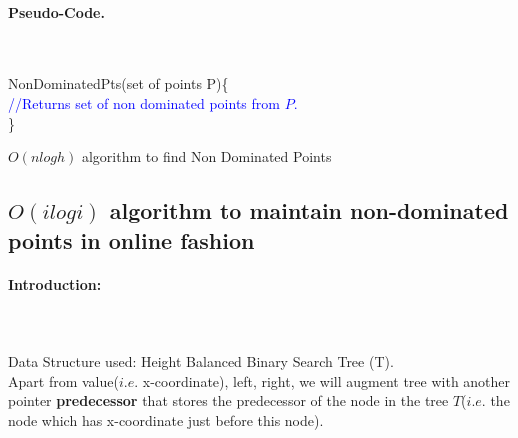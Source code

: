 \documentclass[pdftex,a4paper,12pt]{report}
\begin{document}
\newpage

\paragraph{Pseudo-Code.} \mbox{} \\
\begin{algorithm}

NonDominatedPts(set of points P)\{\\
\makebox[40pt]{}\textcolor{blue}{//Returns set of non dominated points from $P$.}\\
\}
\caption{\textbf{$O(n logh)$} algorithm to find Non Dominated Points}
\end{algorithm}
\newpage

\subsection{\textbf{$O(i logi)$} algorithm to maintain non-dominated points in online fashion}

\paragraph{Introduction:} \makebox[2pt]{}\\\\
Data Structure used: Height Balanced Binary Search Tree (T).\\
Apart from value($i.e.$ x-coordinate), left, right, we will augment tree with another pointer \textbf{predecessor}
that stores the predecessor of the node in the tree $T$($i.e.$ the node which has x-coordinate just before this node).
\end{document}
